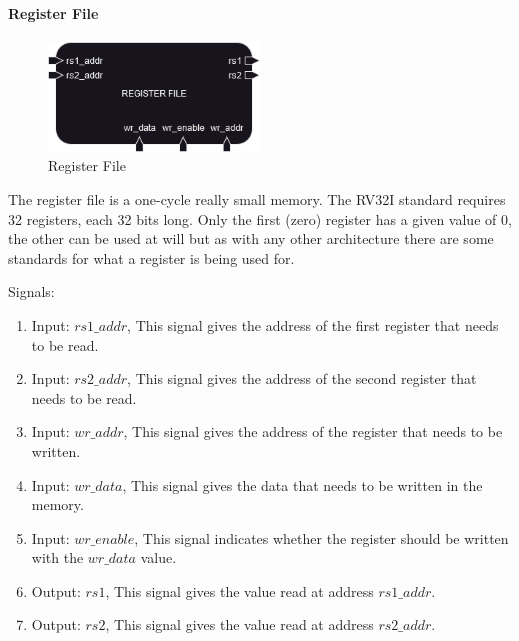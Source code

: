\paragraph{Register File}

\begin{figure}[H]
    \centering
    \includegraphics[width=0.5\textwidth]{design/pipelined/rom_ram_reg/images/register_file.png}
    \caption{Register File}
    \label{fig:register_file}
\end{figure}

The register file is a one-cycle really small memory. The RV32I standard requires 32 registers, each 32 bits long. Only the first (zero) register
has a given value of 0, the other can be used at will but as with any other architecture there are some standards for what a register is being used 
for.

Signals:
\begin{enumerate}[label={\textbullet}]
    \item Input: $rs1\_addr$, This signal gives the address of the first register that needs to be read.
    \item Input: $rs2\_addr$, This signal gives the address of the second register that needs to be read.
    \item Input: $wr\_addr$, This signal gives the address of the register that needs to be written.
    \item Input: $wr\_data$, This signal gives the data that needs to be written in the memory.
    \item Input: $wr\_enable$, This signal indicates whether the register should be written with the $wr\_data$ value.
    \item Output: $rs1$, This signal gives the value read at address $rs1\_addr$.
    \item Output: $rs2$, This signal gives the value read at address $rs2\_addr$.
\end{enumerate}